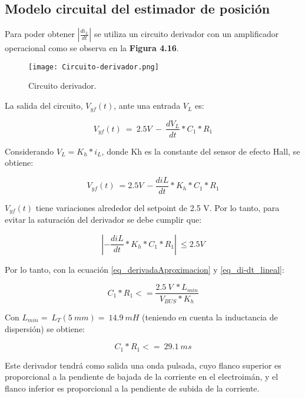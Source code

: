 \subsection{Modelo circuital del estimador de posici\'{o}n}

\noindent Para poder obtener $\left|\frac{{di}_L}{dt}\right|$ se utiliza un circuito derivador con un amplificador operacional como se observa en la \textbf{Figura 4.16}.

\begin{figure}[H]
	\centering
	\texttt{[image: Circuito-derivador.png]}
	\caption{Circuito derivador.}
	\label{fig:img_Circuito-derivador}
\end{figure}

\noindent La salida del circuito, $V_{yf}(t)$, ante una entrada $V_L$ es:

\begin{equation} \label{eq_vyf1}
	V_{yf}(t)\ =\ 2.5V\ -\ \frac{dV_L}{dt}*C_1*R_1
\end{equation}


\noindent Considerando $V_L=K_h*i_L$, donde Kh es la constante del sensor de efecto Hall, se obtiene: 

\begin{equation} \label{eq_vyf2}
	V_{yf}(t)\ =2.5V\ -\frac{diL}{dt}*K_h*C_1*R_1
\end{equation}

\noindent $V_{yf}(t)$ tiene variaciones alrededor del setpoint de 2.5 V. Por lo tanto, para evitar la saturaci\'{o}n del derivador se debe cumplir que:

\begin{equation} \label{eq_vyf3}
	\left|-\frac{diL}{dt}*K_h*C_1*R_1\right|\ \le 2.5V
\end{equation}

\noindent Por lo tanto, con la ecuaci\'{o}n \ref{eq_derivadaAproximacion} y \ref{eq_di-dt_lineal}:

\begin{equation} \label{eq_condicionC1-R1}
	C_1*R_1<=\frac{2.5\ V\ *L_{min}}{V_{BUS}*K_h}
\end{equation}

\noindent Con $L_{min}=\ L_T(5\ mm)=\ 14.9\ mH$ (teniendo en cuenta la inductancia de dispersi\'{o}n) se obtiene: 

\begin{equation} \label{eq_condicionC1-R1-2}
	C_1*R_1<=\ 29.1\ ms
\end{equation}

\noindent Este derivador tendr\'{a} como salida una onda pulsada, cuyo flanco superior  es proporcional a la pendiente de bajada de la corriente en el electroim\'{a}n, y el flanco inferior es proporcional a la pendiente de subida de la corriente. 

